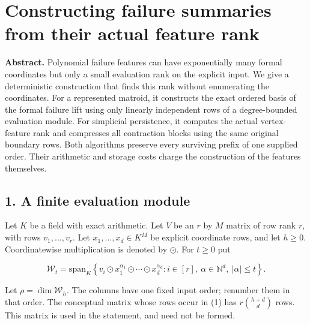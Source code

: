 
\hypertarget{af-4b125c3959-constructing-failure-summaries-from-their-actual-feature-rank}{%
\section{Constructing failure summaries from their actual feature rank}\label{af-4b125c3959-constructing-failure-summaries-from-their-actual-feature-rank}}

\textbf{Abstract.} Polynomial failure features can have exponentially many formal coordinates but only a small evaluation rank on the explicit input. We give a deterministic construction that finds this rank without enumerating the coordinates. For a represented matroid, it constructs the exact ordered basis of the formal failure lift using only linearly independent rows of a degree-bounded evaluation module. For simplicial persistence, it computes the actual vertex-feature rank and compresses all contraction blocks using the same original boundary rows. Both algorithms preserve every surviving prefix of one supplied order. Their arithmetic and storage costs charge the construction of the features themselves.

\hypertarget{af-4b125c3959-a-finite-evaluation-module}{%
\subsection{1. A finite evaluation module}\label{af-4b125c3959-a-finite-evaluation-module}}

Let \(K\) be a field with exact arithmetic. Let \(V\) be an \(r\) by \(M\) matrix of row rank \(r\), with rows \(v_1,\ldots,v_r\). Let \(x_1,\ldots,x_d\in K^M\) be explicit coordinate rows, and let \(h\ge0\). Coordinatewise multiplication is denoted by \(\odot\). For \(t\ge0\) put

\[
\mathcal W_t=\mathrm{span}_K\left\{
 v_i\odot x_1^{\alpha_1}\odot\cdots\odot x_d^{\alpha_d}:
 i\in[r],\ \alpha\in\mathbb N^d,\ |\alpha|\le t\right\}.
\tag{1}
\]

Let \(\rho=\dim\mathcal W_h\). The columns have one fixed input order; renumber them in that order. The conceptual matrix whose rows occur in (1) has \(r\binom{h+d}{d}\) rows. This matrix is used in the statement, and need not be formed.

